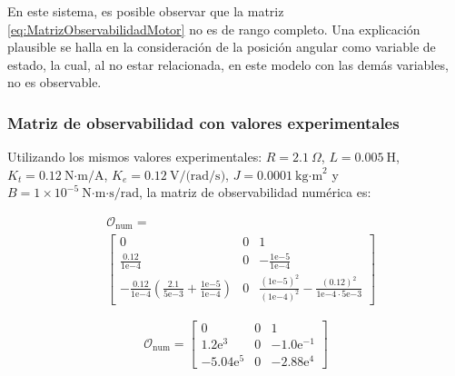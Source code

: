En este sistema, es posible observar que la matriz \eqref{eq:MatrizObservabilidadMotor}
no es de rango completo. Una explicación plausible se halla en la consideración de la
posición angular como variable de estado, la cual, al no estar relacionada, en este
modelo con las demás variables, no es observable.

\subsubsection{Matriz de observabilidad con valores experimentales}

Utilizando los mismos valores experimentales: $R = 2.1\ \Omega$, $L = 0.005\ \text{H}$, $K_t = 0.12\ \text{N·m/A}$, $K_e = 0.12\ \text{V/(rad/s)}$, $J = 0.0001\ \text{kg·m}^2$ y $B = 1\times10^{-5}\ \text{N·m·s/rad}$, la matriz de observabilidad numérica es:

\begin{equation*}
  \begin{aligned}
    &\mathcal{O}_{\text{num}} = \\
    &\begin{bmatrix}
      0 & 0 & 1 \\[2pt]
      \tfrac{0.12}{1\mathrm{e}{-4}} & 0 & -\tfrac{1\mathrm{e}{-5}}{1\mathrm{e}{-4}} \\[2pt]
      -\tfrac{0.12}{1\mathrm{e}{-4}}\left( \tfrac{2.1}{5\mathrm{e}{-3}} + \tfrac{1\mathrm{e}{-5}}{1\mathrm{e}{-4}} \right) & 0 & \tfrac{(1\mathrm{e}{-5})^2}{(1\mathrm{e}{-4})^2} - \tfrac{(0.12)^2}{1\mathrm{e}{-4} \cdot 5\mathrm{e}{-3}}
    \end{bmatrix}
  \end{aligned}
\end{equation*}

\begin{equation}
\mathcal{O}_{\text{num}} = 
\begin{bmatrix}
    0 & 0 & 1 \\[2pt]
    1.2\mathrm{e}^{3} & 0 & -1.0\mathrm{e}^{-1} \\[2pt]
    -5.04\mathrm{e}^{5} & 0 & -2.88\mathrm{e}^{4}
\end{bmatrix}
\label{eq:MatrizObservabilidadMotorValoresExperimentales}
\end{equation}
